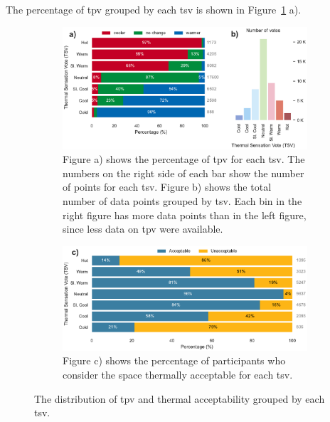 The percentage of \ac{tpv} grouped by each \ac{tsv} is shown in Figure~\ref{fig:bar_plot_tp_by_ts} a).
\begin{figure}[htb!]
    \centering
    \begin{subfigure}[b]{\textwidth}
        \centering
        \includegraphics[width=\textwidth]{figures/bar_plot_tp_by_ts}
        \caption{Figure a) shows the percentage of \ac{tpv} for each \ac{tsv}.
    The numbers on the right side of each bar show the number of points for each \ac{tsv}.
        Figure b) shows the total number of data points grouped by \ac{tsv}.
    Each bin in the right figure has more data points than in the left figure, since less data on \ac{tpv} were available.}
    \label{fig:bar_plot_tp_by_ts}
    \end{subfigure}
    \par\bigskip %
    \begin{subfigure}[b]{\textwidth}
        \centering
        \includegraphics[width=\textwidth]{figures/bar_plot_thermal_acceptability_by_thermal_sensation_round}
    \caption{
        Figure c) shows the percentage of participants who consider the space thermally acceptable for each \ac{tsv}.}
        \label{fig:thermal_acceptability_by_ts}
    \end{subfigure}
    \caption{The distribution of \ac{tpv} and thermal acceptability grouped by each \ac{tsv}.}
\end{figure}
